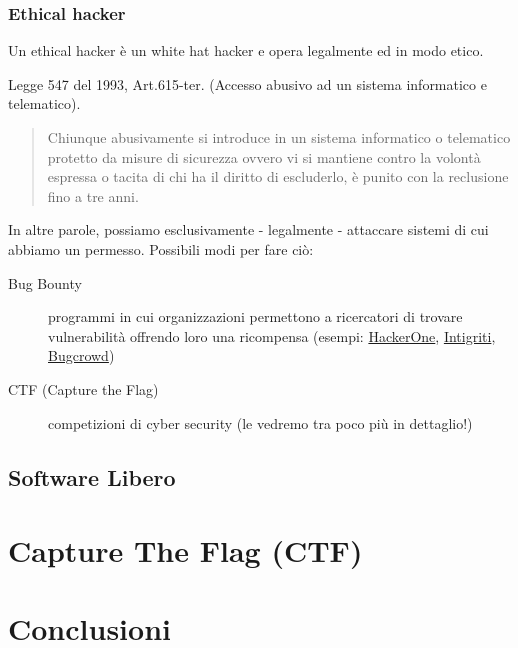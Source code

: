 \documentclass{beamer}
\begin{document}
\subsubsection*{Ethical hacker}
\begin{frame}[allowframebreaks]{\insertsubsection}{\insertsubsubsection}
Un \alert{ethical hacker} è un \alert{white hat hacker} e opera legalmente ed in
modo etico.

\begin{alertblock}{Legge 547 del 1993, Art.615-ter. (Accesso abusivo ad
un sistema informatico e telematico).}
\begin{quote}
Chiunque abusivamente si introduce in un sistema informatico o
telematico protetto da misure di sicurezza ovvero vi si mantiene contro
la volontà espressa o tacita di chi ha il diritto di escluderlo, è
punito con la reclusione fino a tre anni.
\end{quote}
\end{alertblock}

In altre parole, possiamo esclusivamente - legalmente - attaccare sistemi
di cui abbiamo un permesso. Possibili modi per fare ciò:

\begin{description}
\item[Bug Bounty] programmi in cui organizzazioni permettono a ricercatori di
trovare vulnerabilità offrendo loro una ricompensa (esempi:
\href{https://www.hackerone.com/}{HackerOne},
\href{https://www.intigriti.com/}{Intigriti},
\href{https://www.bugcrowd.com/}{Bugcrowd})
\item[CTF (Capture the Flag)] competizioni di cyber security (le vedremo tra
poco più in dettaglio!)
\end{description}
\end{frame}

\subsection{Software Libero}
\begin{frame}{\insertsubsection}
\end{frame}

\section{Capture The Flag (CTF)}
\begin{frame}{\insertsection}
\end{frame}

\section{Conclusioni}
\begin{frame}{\insertsection}
\end{frame}
\end{document}
